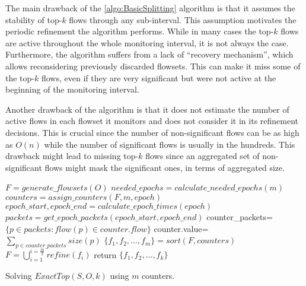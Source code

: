 The main drawback of the \ref{algo:BasicSplitting} algorithm is that it assumes the stability of top-$k$ flows through any sub-interval. This assumption motivates the periodic refinement the algorithm performs.
While in many cases the top-$k$ flows are active throughout the whole monitoring interval, it is not always the case. Furthermore, the algorithm suffers from a lack of ``recovery mechanism'', which allows reconsidering previously discarded flowsets. This can make it miss some of the top-$k$ flows, even if they are very significant but were not active at the beginning of the monitoring interval.

Another drawback of the algorithm is that it does not estimate the number of active flows in each flowset it monitors and does not consider it in its refinement decisions. This is crucial since the number of non-significant flows can be as high as $O(n)$ while the number of significant flows is usually in the hundreds. This drawback might lead to missing top-$k$ flows since an aggregated set of non-significant flows might mask the significant ones, in terms of aggregated size.

\begin{algorithm}
    $F = generate\_flowsets(O)$\;
    $needed\_epochs=calculate\_needed\_epochs(m)$\;
    {
        $counters=assign\_counters(F, m, epoch)$\;
        $epoch\_start, epoch\_end=calculate\_epoch\_times(epoch)$\;
        $packets=get\_epoch\_packets(epoch\_start, epoch\_end)$\;
         {
            counter\_packets=$\{p\in packets : flow(p)\in counter.flow\}$\;
            counter.value=$\sum_{p\in counter\_packets}size(p)$\;
        }
        $\{f_1,f_2,\dots,f_m\}=sort(F, counters)$\;
        $F=\bigcup_{i=1}^{i=\frac{m}{2}}refine(f_i)$\;
    }
    return $\{f_1,f_2,\dots,f_k\}$
    \caption{Solving $ExactTop(S,O,k)$ using $m$ counters.}
    \label{algo:BasicSplitting}
\end{algorithm}
